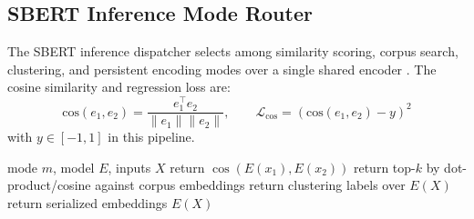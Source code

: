 \subsection{SBERT Inference Mode Router}

The SBERT inference dispatcher selects among similarity scoring, corpus search, clustering, and persistent encoding modes over a single shared encoder \citep{reimers_sentence-bert_2019}. The cosine similarity and regression loss are:
\[
\text{cos}(e_1,e_2)=\frac{e_1^\top e_2}{\|e_1\|\|e_2\|},\qquad
\mathcal{L}_{\text{cos}}=\left(\text{cos}(e_1,e_2)-y\right)^2
\]
with $y\in[-1,1]$ in this pipeline.

\begin{algorithm}[t]
\caption{SBERT Inference Mode Router}
\begin{algorithmic}[1]
\Require mode $m$, model $E$, inputs $X$
    \State return $\cos(E(x_1),E(x_2))$
    \State return top-$k$ by dot-product/cosine against corpus embeddings
    \State return clustering labels over $E(X)$
\Else
    \State return serialized embeddings $E(X)$
\EndIf
\end{algorithmic}
\end{algorithm}